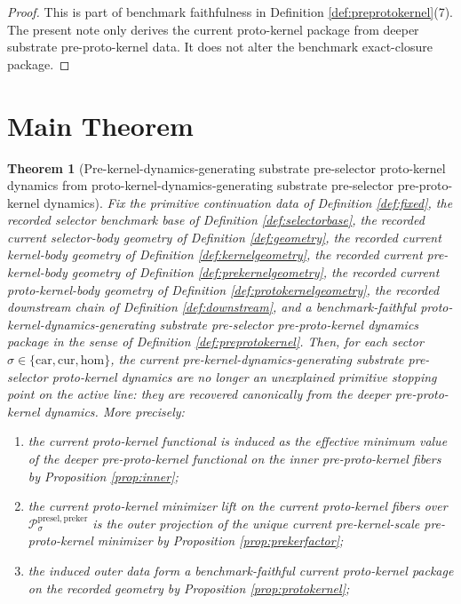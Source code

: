 \documentclass[11pt]{article}
\newcommand{\Car}{\mathrm{car}}
\newcommand{\Cur}{\mathrm{cur}}
\newcommand{\Hom}{\mathrm{hom}}
\newcommand{\PreKernelBody}[1]{\mathcal P_{#1}^{\mathrm{presel,preker}}}
\newtheorem{theorem}{Theorem}
\begin{document}
\begin{proof}
This is part of benchmark faithfulness in Definition \ref{def:preprotokernel}(7). The present note only derives the current proto-kernel package from deeper substrate pre-proto-kernel data. It does not alter the benchmark exact-closure package.
\end{proof}

\section{Main Theorem}

\begin{theorem}[Pre-kernel-dynamics-generating substrate pre-selector proto-kernel dynamics from proto-kernel-dynamics-generating substrate pre-selector pre-proto-kernel dynamics]
\label{thm:main}
Fix the primitive continuation data of Definition \ref{def:fixed}, the recorded selector benchmark base of Definition \ref{def:selectorbase}, the recorded current selector-body geometry of Definition \ref{def:geometry}, the recorded current kernel-body geometry of Definition \ref{def:kernelgeometry}, the recorded current pre-kernel-body geometry of Definition \ref{def:prekernelgeometry}, the recorded current proto-kernel-body geometry of Definition \ref{def:protokernelgeometry}, the recorded downstream chain of Definition \ref{def:downstream}, and a benchmark-faithful proto-kernel-dynamics-generating substrate pre-selector pre-proto-kernel dynamics package in the sense of Definition \ref{def:preprotokernel}. Then, for each sector \(\sigma\in\{\Car,\Cur,\Hom\}\), the current pre-kernel-dynamics-generating substrate pre-selector proto-kernel dynamics are no longer an unexplained primitive stopping point on the active line: they are recovered canonically from the deeper pre-proto-kernel dynamics. More precisely:
\begin{enumerate}
    \item the current proto-kernel functional is induced as the effective minimum value of the deeper pre-proto-kernel functional on the inner pre-proto-kernel fibers by Proposition \ref{prop:inner};
    \item the current proto-kernel minimizer lift on the current proto-kernel fibers over \(\PreKernelBody{\sigma}\) is the outer projection of the unique current pre-kernel-scale pre-proto-kernel minimizer by Proposition \ref{prop:prekerfactor};
    \item the induced outer data form a benchmark-faithful current proto-kernel package on the recorded geometry by Proposition \ref{prop:protokernel};

\end{enumerate}
\end{theorem}
\end{document}
